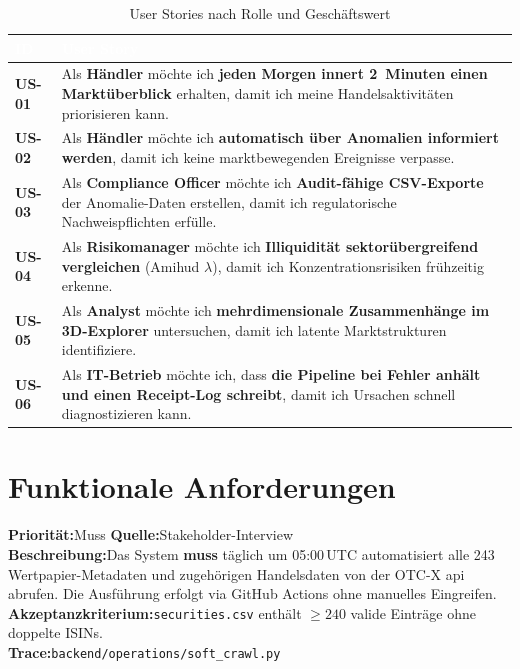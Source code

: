 \documentclass[11pt, a4paper, oneside, openany]{report}
\newcommand{\code}[1]{\texttt{\small\textcolor{DeepNavy}{#1}}}
\begin{document}
\begin{table}[H]
\centering
\caption{User Stories nach Rolle und Geschäftswert}
\label{tab:userstories}
\sffamily\small
\begin{tabularx}{\textwidth}{>{\bfseries\sffamily}l X}
  \toprule
  \rowcolor{DeepNavy} \textcolor{white}{\textbf{ID}} & \textcolor{white}{\textbf{User Story}} \\
  \midrule
  US-01 & Als \textbf{Händler} möchte ich \textbf{jeden Morgen innert 2~Minuten einen Marktüberblick} erhalten, damit ich meine Handelsaktivitäten priorisieren kann. \\
  US-02 & Als \textbf{Händler} möchte ich \textbf{automatisch über Anomalien informiert werden}, damit ich keine marktbewegenden Ereignisse verpasse. \\
  US-03 & Als \textbf{Compliance Officer} möchte ich \textbf{Audit-fähige CSV-Exporte} der Anomalie-Daten erstellen, damit ich regulatorische Nachweispflichten erfülle. \\
  US-04 & Als \textbf{Risikomanager} möchte ich \textbf{Illiquidität sektorübergreifend vergleichen} (Amihud $\lambda$), damit ich Konzentrationsrisiken frühzeitig erkenne. \\
  US-05 & Als \textbf{Analyst} möchte ich \textbf{mehrdimensionale Zusammenhänge im 3D-Explorer} untersuchen, damit ich latente Marktstrukturen identifiziere. \\
  US-06 & Als \textbf{IT-Betrieb} möchte ich, dass \textbf{die Pipeline bei Fehler anhält und einen Receipt-Log schreibt}, damit ich Ursachen schnell diagnostizieren kann. \\
  \bottomrule
\end{tabularx}
\end{table}

\section{Funktionale Anforderungen}
\label{sec:fa}

\begin{reqbox}
\textbf{Priorität:}\;Muss \quad \textbf{Quelle:}\;Stakeholder-Interview \\[4pt]
\textbf{Beschreibung:}\;Das System \textbf{muss} täglich um 05:00\,UTC automatisiert alle 243 Wertpapier-Metadaten und zugehörigen Handelsdaten von der OTC-X \gls{api} abrufen. Die Ausführung erfolgt via GitHub Actions ohne manuelles Eingreifen. \\[4pt]
\textbf{Akzeptanzkriterium:}\;\code{securities.csv} enthält $\geq 240$ valide Einträge ohne doppelte ISINs. \\[4pt]
\textbf{Trace:}\;\code{backend/operations/soft\_crawl.py}
\end{reqbox}
\end{document}
